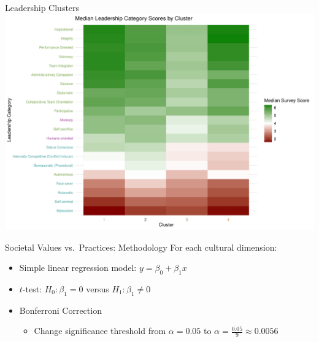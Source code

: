 \documentclass[
  ignorenonframetext,
]{beamer}
\providecommand{\tightlist}{%
  \setlength{\itemsep}{0pt}\setlength{\parskip}{0pt}}
\begin{document}
\begin{frame}{Leadership Clusters}
\protect\hypertarget{leadership-clusters}{}
\includegraphics{final_slides_files/figure-beamer/cluster_values-1.pdf}
\end{frame}

\begin{frame}{Societal Values vs.~Practices: Methodology}
\protect\hypertarget{societal-values-vs.-practices-methodology}{}
For each cultural dimension:

\begin{itemize}
\item
  Simple linear regression model: \(y = \beta_0 + \beta_1 x\)
\item
  \(t\)-test: \(H_0: \beta_1 = 0\) versus \(H_1: \beta_1 \ne 0\)
\item
  Bonferroni Correction

  \begin{itemize}
  \tightlist
  \item
    Change significance threshold from \(\alpha = 0.05\) to
    \(\alpha = \frac{0.05}{9} \approx 0.0056\)
  \end{itemize}
\end{itemize}
\end{frame}
\end{document}
